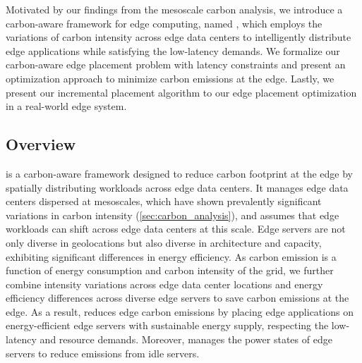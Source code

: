 Motivated by our findings from the mesoscale carbon analysis, we introduce a carbon-aware framework for edge computing, named \proposedsystem, which employs the variations of carbon intensity across edge data centers to intelligently distribute edge applications while satisfying the low-latency demands. We formalize our carbon-aware edge placement problem with latency constraints and present an optimization approach to minimize carbon emissions at the edge. Lastly, we present our incremental placement algorithm to our edge placement optimization in a real-world edge system. 



\subsection{\proposedsystem Overview}

\proposedsystem is a carbon-aware framework designed to reduce carbon footprint at the edge by spatially distributing workloads across edge data centers. It manages edge data centers dispersed at mesoscales, which have shown prevalently significant variations in carbon intensity (\autoref{sec:carbon_analysis}), and assumes that edge workloads can shift across edge data centers at this scale. 
Edge servers are not only diverse in geolocations but also diverse in architecture and capacity, exhibiting significant differences in energy efficiency. As carbon emission is a function of energy consumption and carbon intensity of the grid, we further combine intensity variations across edge data center locations and energy efficiency differences across diverse edge servers to save carbon emissions at the edge. As a result,  \proposedsystem reduces edge carbon emissions by placing edge applications on energy-efficient edge servers with sustainable energy supply, respecting the low-latency and resource demands. Moreover, \proposedsystem manages the power states of edge servers to reduce emissions from idle servers. 

